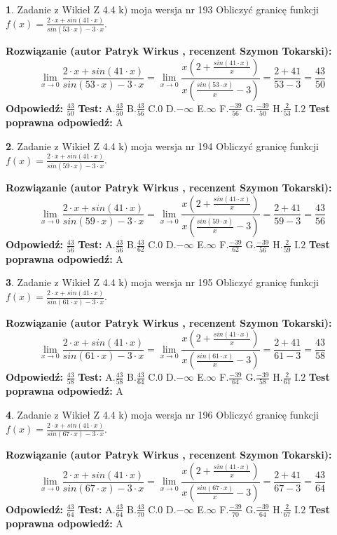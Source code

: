 \documentclass[12pt, a4paper]{article}
\theoremstyle{definition} %
\newtheorem{zad}{}
\newcommand{\zadStart}[1]{\begin{zad}#1\newline}
\newcommand{\zadStop}{\end{zad}}
\newcommand{\rozwStart}[2]{\noindent \textbf{Rozwiązanie (autor #1 , recenzent #2): }\newline}
\newcommand{\rozwStop}{\newline}
\newcommand{\odpStart}{\noindent \textbf{Odpowiedź:}\newline}
\newcommand{\odpStop}{\newline}
\newcommand{\testStart}{\noindent \textbf{Test:}\newline}
\newcommand{\testStop}{\newline}
\newcommand{\kluczStart}{\noindent \textbf{Test poprawna odpowiedź:}\newline}
\newcommand{\kluczStop}{\newline}
\begin{document}
\zadStart{Zadanie z Wikieł Z 4.4 k) moja wersja nr 193}
Obliczyć granicę funkcji $f(x)=\frac{2\cdot x +sin(41\cdot x)}{sin(53\cdot x) -3\cdot x}$.
\zadStop
\rozwStart{Patryk Wirkus}{Szymon Tokarski}
$$\lim\limits_{x\to 0}\frac{2\cdot x +sin(41\cdot x)}{sin(53\cdot x) -3\cdot x}
=\lim\limits_{x\to 0}\frac{x(2+\frac{sin(41\cdot x)}{x})}{x(\frac{sin(53\cdot x)}{x}-3)}
=\frac{2+41}{53-3} = \frac{43}{50}$$
\rozwStop
\odpStart
$\frac{43}{50}$
\odpStop
\testStart
A.$\frac{43}{50}$
B.$\frac{43}{56}$
C.$0$
D.$-\infty$
E.$\infty$
F.$\frac{-39}{56}$
G.$\frac{-39}{50}$
H.$\frac{2}{53}$
I.$2$
\testStop
\kluczStart
A
\kluczStop



\zadStart{Zadanie z Wikieł Z 4.4 k) moja wersja nr 194}
Obliczyć granicę funkcji $f(x)=\frac{2\cdot x +sin(41\cdot x)}{sin(59\cdot x) -3\cdot x}$.
\zadStop
\rozwStart{Patryk Wirkus}{Szymon Tokarski}
$$\lim\limits_{x\to 0}\frac{2\cdot x +sin(41\cdot x)}{sin(59\cdot x) -3\cdot x}
=\lim\limits_{x\to 0}\frac{x(2+\frac{sin(41\cdot x)}{x})}{x(\frac{sin(59\cdot x)}{x}-3)}
=\frac{2+41}{59-3} = \frac{43}{56}$$
\rozwStop
\odpStart
$\frac{43}{56}$
\odpStop
\testStart
A.$\frac{43}{56}$
B.$\frac{43}{62}$
C.$0$
D.$-\infty$
E.$\infty$
F.$\frac{-39}{62}$
G.$\frac{-39}{56}$
H.$\frac{2}{59}$
I.$2$
\testStop
\kluczStart
A
\kluczStop



\zadStart{Zadanie z Wikieł Z 4.4 k) moja wersja nr 195}
Obliczyć granicę funkcji $f(x)=\frac{2\cdot x +sin(41\cdot x)}{sin(61\cdot x) -3\cdot x}$.
\zadStop
\rozwStart{Patryk Wirkus}{Szymon Tokarski}
$$\lim\limits_{x\to 0}\frac{2\cdot x +sin(41\cdot x)}{sin(61\cdot x) -3\cdot x}
=\lim\limits_{x\to 0}\frac{x(2+\frac{sin(41\cdot x)}{x})}{x(\frac{sin(61\cdot x)}{x}-3)}
=\frac{2+41}{61-3} = \frac{43}{58}$$
\rozwStop
\odpStart
$\frac{43}{58}$
\odpStop
\testStart
A.$\frac{43}{58}$
B.$\frac{43}{64}$
C.$0$
D.$-\infty$
E.$\infty$
F.$\frac{-39}{64}$
G.$\frac{-39}{58}$
H.$\frac{2}{61}$
I.$2$
\testStop
\kluczStart
A
\kluczStop



\zadStart{Zadanie z Wikieł Z 4.4 k) moja wersja nr 196}
Obliczyć granicę funkcji $f(x)=\frac{2\cdot x +sin(41\cdot x)}{sin(67\cdot x) -3\cdot x}$.
\zadStop
\rozwStart{Patryk Wirkus}{Szymon Tokarski}
$$\lim\limits_{x\to 0}\frac{2\cdot x +sin(41\cdot x)}{sin(67\cdot x) -3\cdot x}
=\lim\limits_{x\to 0}\frac{x(2+\frac{sin(41\cdot x)}{x})}{x(\frac{sin(67\cdot x)}{x}-3)}
=\frac{2+41}{67-3} = \frac{43}{64}$$
\rozwStop
\odpStart
$\frac{43}{64}$
\odpStop
\testStart
A.$\frac{43}{64}$
B.$\frac{43}{70}$
C.$0$
D.$-\infty$
E.$\infty$
F.$\frac{-39}{70}$
G.$\frac{-39}{64}$
H.$\frac{2}{67}$
I.$2$
\testStop
\kluczStart
A
\kluczStop
\end{document}
